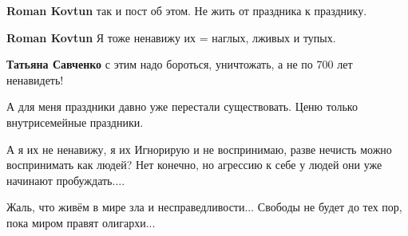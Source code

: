 \begin{itemize}
\begin{itemize}
\textbf{Roman Kovtun} так и пост об этом. Не жить от праздника к празднику.

 
\textbf{Roman Kovtun} Я тоже ненавижу их = наглых, лживых и тупых.

 
\textbf{Татьяна Савченко} с этим надо бороться, уничтожать, а не по 700 лет ненавидеть!

 
А для меня праздники давно уже перестали существовать. Ценю только
внутрисемейные праздники.


 

А я их не ненавижу, я их Игнорирую и не воспринимаю, разве нечисть можно
воспринимать как людей? Нет конечно, но агрессию к себе у людей они уже
начинают пробуждать....

\end{itemize}

 
Жаль, что живём в мире зла и несправедливости... Свободы не будет до тех пор,
пока миром правят олигархи...

\begin{itemize}
 

\end{itemize}
\end{itemize}
